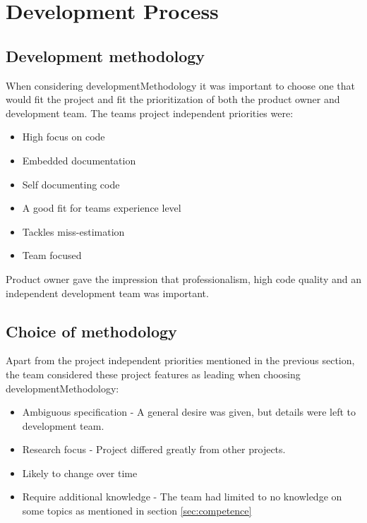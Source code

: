 \chapter{Development Process}
\label{chap:process}

\section{Development methodology}

When considering \gls{developmentMethodology} it was important to choose one that would fit the project and fit the prioritization of both the product owner and development team.
The teams project independent priorities were:
\begin{itemize}
    \item High focus on code
    \item Embedded documentation
    \item Self documenting code
    \item A good fit for teams experience level
    \item Tackles miss-estimation
    \item Team focused
\end{itemize}

Product owner gave the impression that professionalism, high code quality and an independent development team was important.

\section{Choice of methodology}
\label{sec:methodology}
Apart from the project independent priorities mentioned in the previous section, the team considered these project features as leading when choosing \gls{developmentMethodology}:

\begin{itemize}
    \item Ambiguous specification - A general desire was given, but details were left to development team.
    \item Research focus - Project differed greatly from other projects.
    \item Likely to change over time
    \item Require additional knowledge - The team had limited to no knowledge on some topics as mentioned in section \ref{sec:competence}
\end{itemize}

